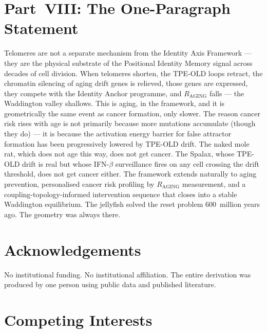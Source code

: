 \documentclass[12pt,a4paper]{article}
\newcommand{\raging}{$R_{\mathrm{AGING}}$}
\newcommand{\tpeold}{TPE-OLD}
\begin{document}
\section{Part~VIII: The One-Paragraph Statement}

Telomeres are not a separate mechanism from the Identity Axis Framework ---
they are the physical substrate of the Positional Identity Memory signal across
decades of cell division. When telomeres shorten, the \tpeold{} loops retract,
the chromatin silencing of aging drift genes is relieved, those genes are
expressed, they compete with the Identity Anchor programme, and \raging{} falls
--- the Waddington valley shallows. This is aging, in the framework, and it is
geometrically the same event as cancer formation, only slower. The reason
cancer risk rises with age is not primarily because more mutations accumulate
(though they do) --- it is because the activation energy barrier for false
attractor formation has been progressively lowered by \tpeold{} drift. The
naked mole rat, which does not age this way, does not get cancer. The Spalax,
whose \tpeold{} drift is real but whose IFN-$\beta$ surveillance fires on any
cell crossing the drift threshold, does not get cancer either. The framework
extends naturally to aging prevention, personalised cancer risk profiling by
\raging{} measurement, and a coupling-topology-informed intervention sequence
that closes into a stable Waddington equilibrium. The jellyfish solved the
reset problem 600~million years ago. The geometry was always there.

\section*{Acknowledgements}

No institutional funding. No institutional affiliation. The entire derivation
was produced by one person using public data and published literature.

\section*{Competing Interests}
\end{document}
